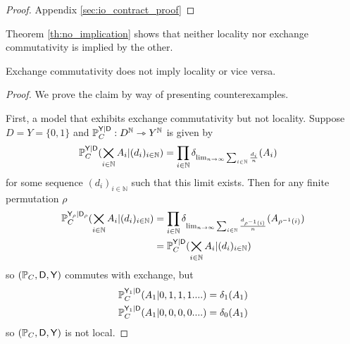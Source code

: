 \begin{proof}
Appendix \ref{sec:io_contract_proof}
\end{proof}

Theorem \ref{th:no_implication} shows that neither locality nor exchange commutativity is implied by the other.

\begin{theorem}\label{th:no_implication}
Exchange commutativity does not imply locality or vice versa.
\end{theorem}

\begin{proof}
We prove the claim by way of presenting counterexamples.

First, a model that exhibits exchange commutativity but not locality. Suppose $D=Y=\{0,1\}$ and $\mathbb{P}_C^{\mathsf{Y}|\mathsf{D}}:D^{\mathbb{N}}\rightarrowtriangle Y^{\mathbb{N}}$ is given by
\begin{align}
    \mathbb{P}_C^{\mathsf{Y}|\mathsf{D}}(\bigtimes_{i\in\mathbb{N}} A_i |(d_i)_{i\in\mathbb{N}}) &= \prod_{i\in \mathbb{N}} \delta_{\lim_{n\to\infty} \sum_{i\in\mathbb{N}} \frac{d_i}{n}}(A_i)
\end{align}
for some sequence $(d_i)_{i\in\mathbb{N}}$ such that this limit exists. Then for any finite permutation $\rho$
\begin{align}
    \mathbb{P}_C^{\mathsf{Y}_\rho|\mathsf{D}_\rho}(\bigtimes_{i\in\mathbb{N}} A_i |(d_i)_{i\in\mathbb{N}}) &= \prod_{i\in \mathbb{N}} \delta_{\lim_{n\to\infty} \sum_{i\in\mathbb{N}} \frac{d_{\rho^{-1}(i)}}{n}}(A_{\rho^{-1}(i)})\\
    &= \mathbb{P}_C^{\mathsf{Y}|\mathsf{D}}(\bigtimes_{i\in\mathbb{N}} A_i |(d_i)_{i\in\mathbb{N}})
\end{align}
so $(\mathbb{P}_C,\mathsf{D},\mathsf{Y})$ commutes with exchange, but
\begin{align}
    \mathbb{P}_C^{\mathsf{Y}_1|\mathsf{D}}(A_1 |0,1,1,1....) &= \delta_1(A_1)\\
    \mathbb{P}_C^{\mathsf{Y}_1|\mathsf{D}}(A_1 |0,0,0,0....) &= \delta_0(A_1)
\end{align}
so $(\mathbb{P}_C,\mathsf{D},\mathsf{Y})$ is not local.


\end{proof}
